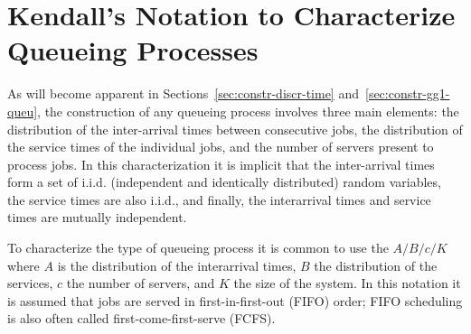 
\section{Kendall's Notation to Characterize Queueing Processes}
\label{sec:kendalls-notation}

As will become apparent in Sections~\ref{sec:constr-discr-time}
and~\ref{sec:constr-gg1-queu}, the construction of any queueing
process involves three main elements: the distribution of the
inter-arrival times between consecutive jobs, the distribution of the
service times of the individual jobs, and the number of servers
present to process jobs. In this characterization it is implicit that
the inter-arrival times form a set of i.i.d. (independent and
identically distributed) random variables, the service times are also
i.i.d., and finally, the interarrival times and service times are
mutually independent.

To characterize the type of queueing process it is common to use the
 $A/B/c/K$ where $A$ is the distribution of the
interarrival times, $B$ the distribution of the services, $c$ the
number of servers, and $K$ the size of the system. In this notation it
is assumed that jobs are served in first-in-first-out (FIFO) order;
FIFO scheduling is also often called first-come-first-serve (FCFS).

